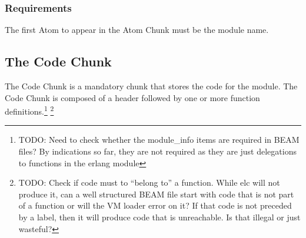 \documentclass{article}
\begin{document}
\subsubsection{Requirements}
The first Atom to appear in the Atom Chunk must be the module name.

\subsection{The Code Chunk}
The Code Chunk is a mandatory chunk that stores the code for the module.  
The Code Chunk is composed of a header followed by one or more function definitions.\footnote{TODO:
Need to check whether the module\_info items are required in BEAM files?  By indications so
far, they are not required as they are just delegations to functions in the erlang module}
\footnote{TODO: Check if code must to ``belong to'' a function.  While elc will not produce it,
can a well structured BEAM file
start with code that is not part of a function or will the VM loader error on it? 
If that code is not preceded by a label, then it will produce code that is unreachable. 
Is that illegal or just wasteful?}
\end{document}
